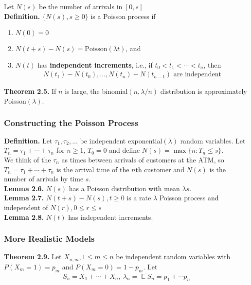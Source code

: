 \documentclass[12pt]{article}
\DeclareMathOperator*{\E}{\mathbb{E}}
\begin{document}
Let $N(s)$ be the number of arrivals in $[0, s]$\\

\textbf{Definition.} $\{N(s), s \geq 0\}$ is a Poisson process if
\begin{enumerate}
\item $N(0) = 0$
\item $N(t+s) - N(s) = \text{Poisson}(\lambda t)$, and
\item $N(t)$ has \textbf{independent increments}, i.e., if $t_0 < t_1 < \cdots < t_n$, then
\begin{align*}
N(t_1) - N(t_0), \ldots, N(t_n) - N(t_{n-1}) \text{  are independent}
\end{align*}
\end{enumerate}

\textbf{Theorem 2.5.} If $n$ is large, the binomial$(n, \lambda/n)$ distribution is approximately Poisson$(\lambda)$.

\subsubsection{Constructing the Poisson Process}

\textbf{Definition.} Let $\tau_1, \tau_2, \ldots$ be independent exponential$(\lambda)$ random variables. Let $T_n = \tau_1 + \cdots + \tau_n$ for $n \geq 1$, $T_0 = 0$ and define $N(s) = \max\{n: T_n \leq s\}$.\\

We think of the $\tau_n$ as times between arrivals of customers at the ATM, so $T_n = \tau_1 + \cdots + \tau_n$ is the arrival time of the $n$th customer and $N(s)$ is the number of arrivals by time $s$.\\

\textbf{Lemma 2.6.} $N(s)$ has a Poisson distribution with mean $\lambda s$.\\

\textbf{Lemma 2.7.} $N(t+s) - N(s), t \geq 0$ is a rate $\lambda$ Poisson process and independent of $N(r), 0 \leq r \leq s$\\

\textbf{Lemma 2.8.} $N(t)$ has independent increments.

\subsubsection{More Realistic Models}

\textbf{Theorem 2.9.} Let $X_{n,m}, 1 \leq m \leq n$ be independent random variables with $P(X_m = 1) = p_m$ and $P(X_m = 0) = 1 - p_m$. Let 
\begin{align*}
S_n = X_1 + \cdots + X_n, \ \lambda_n = \E S_n = p_1 + \cdots p_n
\end{align*}
\end{document}
